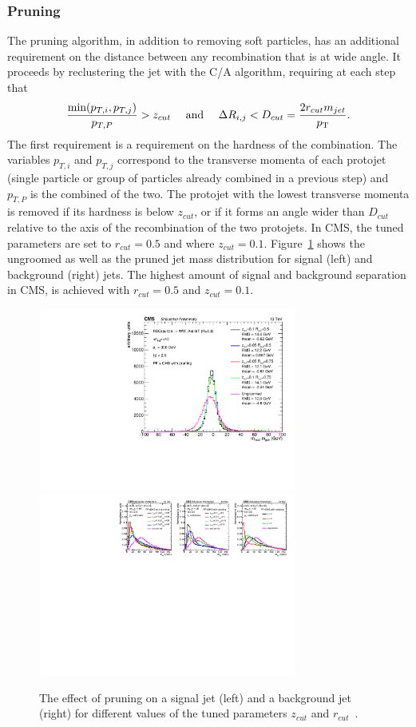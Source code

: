 \subsubsection{Pruning}
\label{sec:objreco:pruning}
The pruning algorithm, in addition to removing soft particles, has an additional requirement on the distance between any recombination that is at wide angle.
It proceeds by reclustering the jet with the C/A algorithm, requiring at each step that
\begin{equation*}
\frac{ \textrm{min}(p_{T,i},p_{T,j}) }{ p_{T,P} } > z_{cut} \quad \textrm{ and } \quad \Delta R_{i,j} < D_{cut} = \frac{2 r_{cut} m_{jet}}{p_{\mathrm{T}}}.
\end{equation*}
The first requirement is a requirement on the hardness of the combination. The variables $p_{T,i}$ and $p_{T,j}$ correspond to the transverse momenta of each protojet (single particle or group of particles already combined in a previous step) and $p_{T,P}$ is the combined \PT of the two. The protojet with the lowest transverse momenta is removed if its hardness is below $z_{cut}$, or if it forms an angle wider than $D_{cut}$ relative to the axis of the recombination of the two protojets. In CMS, the tuned parameters are set to $r_{cut}=0.5$ and where $z_{cut}=0.1$. Figure~\ref{fig:objreco:pruning} shows the ungroomed as well as the pruned jet mass distribution for signal (left) and background (right) jets. The highest amount of signal and background separation in CMS, is achieved with $r_{cut}=0.5$ and $z_{cut}=0.1$.
\begin{figure}[h] 
    \centering
    \includegraphics[height=6cm]{figures/event_reconstruction/sig_pruning.pdf}
    \includegraphics[height=6cm]{figures/event_reconstruction/bkg_pruning-noData.pdf}
    \caption{The effect of pruning on a signal jet (left) and a background jet (right) for different values of the tuned parameters $z_{cut}$ and $r_{cut}$~\cite{CMS-PAS-JME-14-001}.}
    \label{fig:objreco:pruning}
\end{figure}



